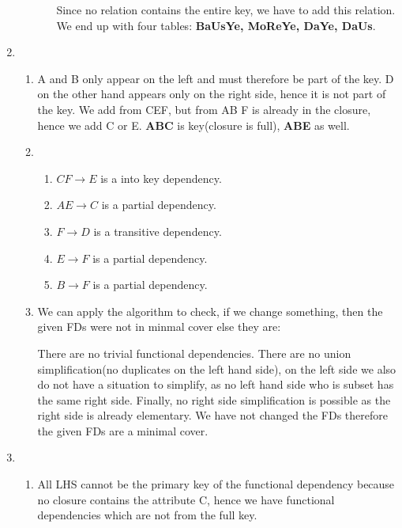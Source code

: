 \documentclass[12pt]{extarticle}
\begin{document}
\begin{flushleft}
\begin{enumerate}
\begin{enumerate}
\begin{enumerate}
 Since no relation contains the entire key, we have to add this relation. We end up with four tables: \textbf{BaUsYe, MoReYe, DaYe, DaUs}.
\end{enumerate}
\end{enumerate}



\item \begin{enumerate} 
\item A and B only appear on the left and must therefore be part of the key. D on the other hand appears only on the right side, hence it is not part of the key. We add from CEF, but from AB F is already in the closure, hence we add C or E. \textbf{ABC} is key(closure is full), \textbf{ABE} as well. 
\item \begin{enumerate}
\item $CF\rightarrow E$ is a into key dependency. 
\item $AE\rightarrow C$ is a partial dependency.
\item $F \rightarrow D$ is a transitive dependency.
\item $E\rightarrow F $ is  a partial dependency.
\item $B \rightarrow F$ is a partial dependency.
\end{enumerate}
\item We can apply the algorithm to check, if we change something, then the given FDs were not in minmal cover else they are: 

There are no trivial functional dependencies. There are no union simplification(no duplicates on the left hand side), on the left side we also do not have a situation to simplify, as no left hand side who is subset has the same right side. Finally, no right side simplification is possible as the right side is already elementary.
We have not changed the FDs therefore the given FDs are a minimal cover.

\end{enumerate}





\item 
\begin{enumerate}
\item All LHS cannot be the primary key of the functional dependency because no closure contains the attribute C, hence we have functional dependencies which are not from the full key.


\end{enumerate}
\end{enumerate}
\end{flushleft}
\end{document}
